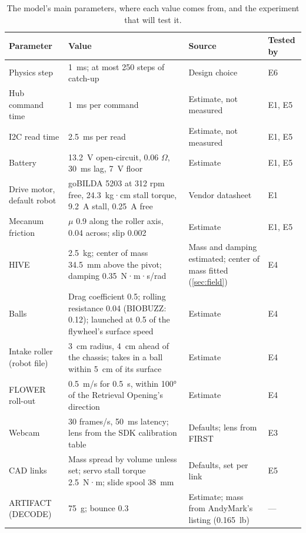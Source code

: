 \documentclass[10pt,twocolumn,letterpaper]{article}
\begin{document}
\begin{table}[t]
\centering
\small
\caption{The model's main parameters, where each value comes from, and the experiment that will test it.}\label{tab:params}
\begin{tabularx}{\textwidth}{@{}>{\raggedright\arraybackslash}p{3.0cm}L>{\raggedright\arraybackslash}p{4.4cm}>{\raggedright\arraybackslash}p{1.4cm}@{}}
\toprule
\textbf{Parameter} & \textbf{Value} & \textbf{Source} & \textbf{Tested by} \\
\midrule
Physics step & 1~ms; at most 250 steps of catch-up & Design choice & E6 \\
Hub command time & 1~ms per command & Estimate, not measured & E1, E5 \\
I2C read time & 2.5~ms per read & Estimate, not measured & E1, E5 \\
Battery & 13.2~V open-circuit, 0.06 $\Omega$, 30~ms lag, 7~V floor & Estimate & E1, E5 \\
Drive motor, default robot & goBILDA 5203 at 312 rpm free, 24.3~kg·cm stall torque, 9.2~A stall, 0.25~A free & Vendor datasheet & E1 \\
Mecanum friction & $\mu$ 0.9 along the roller axis, 0.04 across; slip 0.002 & Estimate & E1, E5 \\
HIVE & 2.5~kg; center of mass 34.5~mm above the pivot; damping 0.35~N·m·s/rad & Mass and damping estimated; center of mass fitted (\cref{sec:field}) & E4 \\
Balls & Drag coefficient 0.5; rolling resistance 0.04 (BIOBUZZ: 0.12); launched at 0.5 of the flywheel’s surface speed & Estimate & E4 \\
Intake roller (robot file) & 3~cm radius, 4~cm ahead of the chassis; takes in a ball within 5~cm of its surface & Estimate & E4 \\
FLOWER roll-out & 0.5~m/s for 0.5~s, within 100° of the Retrieval Opening's direction & Estimate & E4 \\
Webcam & 30 frames/s, 50~ms latency; lens from the SDK calibration table & Defaults; lens from FIRST & E3 \\
CAD links & Mass spread by volume unless set; servo stall torque 2.5~N·m; slide spool 38~mm & Defaults, set per link & E5 \\
ARTIFACT (DECODE) & 75~g; bounce 0.3 & Estimate; mass from AndyMark's listing (0.165~lb) & — \\
\bottomrule
\end{tabularx}
\end{table}
\end{document}
